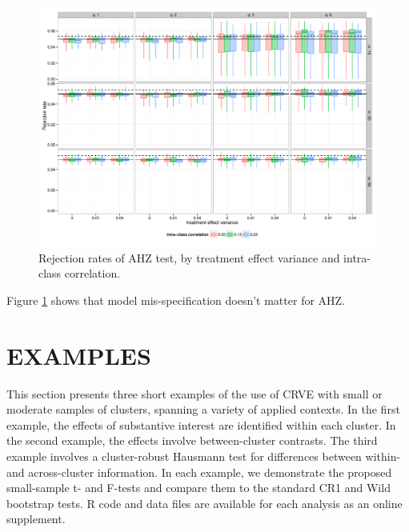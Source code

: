 \documentclass[12pt]{article}\usepackage[]{graphicx}\usepackage[]{color}
\newenvironment{knitrout}{}{} %
\begin{document}
\begin{knitrout}
\color{fgcolor}\begin{figure}

{\centering \includegraphics[width=\linewidth]{CR_fig/misspecification-1} 

}

\caption[Rejection rates of AHZ test, by treatment effect variance and intra-class correlation]{Rejection rates of AHZ test, by treatment effect variance and intra-class correlation.}\label{fig:misspecification}
\end{figure}


\end{knitrout}

Figure \ref{fig:misspecification} shows that model mis-specification doesn't matter for AHZ. 

\section{EXAMPLES}
\label{sec:examples}

This section presents three short examples of the use of CRVE with small or moderate samples of clusters, spanning a variety of applied contexts. 
In the first example, the effects of substantive interest are identified within each cluster. 
In the second example, the effects involve between-cluster contrasts. 
The third example involves a cluster-robust Hausmann test for differences between within- and across-cluster information. 
In each example, we demonstrate the proposed small-sample t- and F-tests and compare them to the standard CR1 and Wild bootstrap tests. 
R code and data files are available for each analysis as an online supplement.
\end{document}
